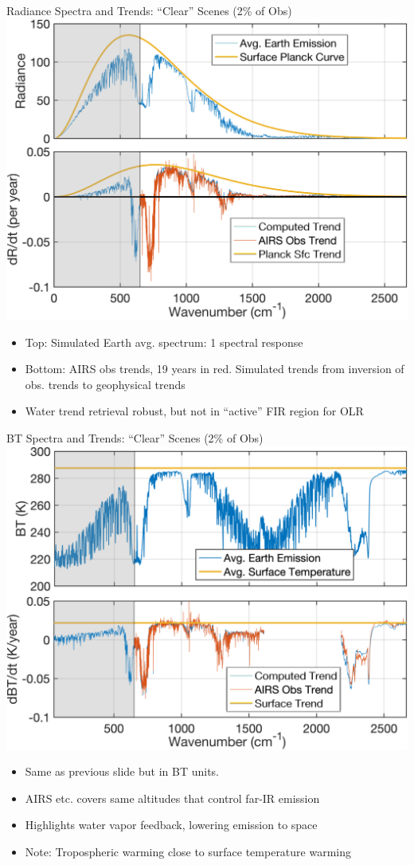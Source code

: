 \documentclass[10pt,t]{beamer}
\begin{document}
\begin{frame}{Radiance Spectra and Trends: ``Clear'' Scenes (2\% of Obs)}
\centering \includegraphics[width=0.7\linewidth]{Figslls/rad_trends_all_cm.png}
\begin{small}
\begin{itemize}
\item Top: Simulated Earth avg. spectrum: 1 \wn spectral response
\item Bottom: AIRS obs trends, 19 years in red.  Simulated trends from inversion of obs. trends to geophysical trends
\item Water trend retrieval robust, but not in ``active'' FIR region for OLR
\end{itemize}
\end{small}
\end{frame}
\begin{frame}{BT Spectra and Trends: ``Clear'' Scenes (2\% of Obs)}
\vspace{-0.03in}
\centering \includegraphics[width=0.7\linewidth]{Figslls/bt_trends_all_cm.png}
\vspace{-0.05in}
\begin{small}
\begin{itemize}
\item Same as previous slide but in BT units.
\item AIRS etc. covers same altitudes that control far-IR emission
\item Highlights water vapor feedback, lowering emission to space
\item Note: Tropospheric warming close to surface temperature warming  
\end{itemize}
\end{small}
\end{frame}
\end{document}
